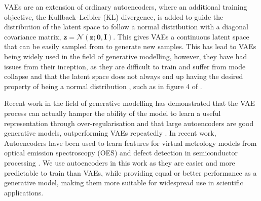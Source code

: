 \documentclass[10pt]{iopart}
\newcommand{\xin}[2]{$x_#2$}
\newcommand{\xout}[2]{$\hat x_#2$}
\newcommand{\zlat}[2]{$z_#2$}
\newcommand{\gdnote}[2][\textcolor{blue}{\dagger}]{$#1$\marginpar{\color{blue}\raggedright\tiny$#1$ #2}}
\begin{document}
    
    
    
    
    
    



VAEs are an extension of ordinary autoencoders, where an additional training objective, the Kullback–Leibler (KL) divergence, is added to guide the distribution of the latent space to follow a normal distribution with a diagonal covariance matrix, $\mathbf{z} = \mathcal{N} (\mathbf{z; 0, I})$. This gives VAEs a continuous latent space that can be easily sampled from to generate new samples. This has lead to VAEs being widely used in the field of generative modelling, however, they have had issues from their inception, as they are difficult to train and suffer from mode collapse \cite{vandenoordNeuralDiscreteRepresentation2017, heLaggingInferenceNetworks2019} and that the latent space does not always end up having the desired property of being a normal distribution \cite{kingmaImprovedVariationalInference2016}, such as in figure 4 of \cite{gergsEfficientPlasmasurfaceInteraction2022}.

Recent work in the field of generative modelling  has demonstrated that the VAE process can actually hamper the ability of the model to learn a useful representation through over-regularisation and that large autoencoders are good generative models, outperforming VAEs repeatedly \cite{ghoshVariationalDeterministicAutoencoders2019, ghoseBatchNormEntropic2020, dalyVariationalAutoencodersVariation2022}. In recent work, Autoencoders have been used to learn features for virtual metrology models from optical emission spectroscopy (OES) \cite{maggipintoConvolutionalAutoencoderApproach2018} and defect detection in semiconductor processing \cite{zhangAutomatedFaultDetection2020}. We use autoencoders in this work as they are easier and more predictable to train than VAEs, while providing equal or better performance as a generative model, making them more suitable for widespread use in scientific applications. 
\end{document}
